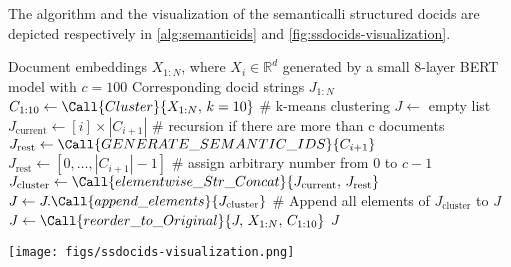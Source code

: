 The algorithm and the visualization of the semanticalli structured docids are depicted respectively in \ref{alg:semanticids} and \ref{fig:ssdocids-visualization}.


\begin{algorithm}[H]
    \caption{Generating Semantically Structured Identifiers}
    \label{alg:semanticids}
    \begin{algorithmic}[1]
    \Require Document embeddings $X_{1:N}$, where $X_i \in \mathbb{R}^d$ generated by a small 8-layer BERT model with $c=100$
    \Ensure Corresponding docid strings $J_{1:N}$
        \State $C_{1:10} \gets \Call{Cluster}{X_{1:N},\, k=10}$ \# k-means clustering
        \State $J \gets$ empty list
            \State $J_{\text{current}} \gets [i] \times |C_{i+1}|$
             \# recursion if there are more than c documents
                \State $J_{\text{rest}} \gets \Call{GENERATE\_SEMANTIC\_IDS}{C_{i+1}}$
            \Else
                \State $J_{\text{rest}} \gets [0,\dots,|C_{i+1}| - 1]$ \# assign arbitrary number from 0 to $c-1$
            \EndIf
            \State $J_{\text{cluster}} \gets \Call{elementwise\_Str\_Concat}{J_{\text{current}},\,J_{\text{rest}}}$
            \State $J \gets J.\Call{append\_elements}{J_{\text{cluster}}}$ \# Append all elements of $J_{\text{cluster}}$ to $J$
        \EndFor
        \State $J \gets \Call{reorder\_to\_Original}{J,\,X_{1:N},\,C_{1:10}}$
        \State \Return $J$
    \EndFunction
    \end{algorithmic}
\end{algorithm}


\begin{figure*}
    \centering
    \texttt{[image: figs/ssdocids-visualization.png]}
    \caption{Visualization of the Semantically Structured Docids tree for extracting identifiers from latent space.}
    \label{fig:ssdocids-visualization}
  \end{figure*}

